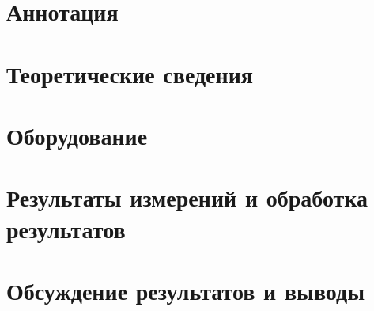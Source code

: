 \documentclass[a4paper, 12pt]{article}
\begin{document}

\section{Аннотация}







\section{Теоретические сведения}







\section{Оборудование}







\section{Результаты измерений и обработка результатов}







\section{Обсуждение результатов и выводы}
\end{document}
